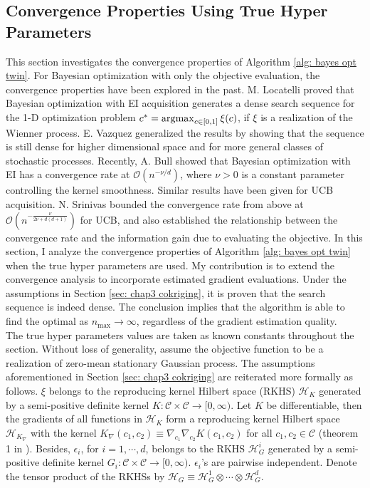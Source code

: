 \subsection{Convergence Properties Using True Hyper Parameters}
\label{sec: chap3 convergence}
This section investigates the convergence properties 
of Algorithm \ref{alg: bayes opt twin}.
For Bayesian optimization with only the 
objective evaluation, the convergence properties have been explored in the past.
M. Locatelli \cite{Locatelli} proved that Bayesian optimization with EI acquisition
generates a dense search sequence 
for the 1-D optimization problem 
$c^*=\operatorname*{\arg\!\max}_{c\in[0,1]} \xi(c)$, if $\xi$ is a realization of the Wienner process.
E. Vazquez \cite{convergen EI} generalized the results by showing that the sequence is still dense
for higher dimensional space and for more general classes of stochastic processes.
Recently, A. Bull \cite{converge Bull} showed that Bayesian optimization with EI
has a convergence rate at
$\mathcal{O}(n^{-\nu/d})$,
where $\nu>0$ is a constant parameter controlling the kernel smoothness. 
Similar results have been given for UCB acquisition. 
N. Srinivas \cite{GP bandit} bounded the convergence rate
from above at $\mathcal{O}(n^{- \frac{\nu}{2\nu+d(d+1)}})$ for UCB, and also established the 
relationship between the convergence rate and the information gain due to evaluating the objective.
In this section, I analyze the convergence properties of Algorithm \ref{alg: bayes opt twin} when 
the true hyper parameters are used. My contribution is to
extend the convergence analysis to incorporate estimated gradient evaluations.
Under the assumptions in Section \ref{sec: chap3 cokriging}, it is proven that
the search sequence is indeed dense.
The conclusion implies that the algorithm is able to find the optimal 
as $n_{\max}\rightarrow \infty$, regardless
of the gradient estimation quality.\\

The true hyper parameters values are taken as known constants throughout the section.
Without loss of generality, assume the objective function to be a realization of 
zero-mean stationary Gaussian process.
The assumptions aforementioned
in Section \ref{sec: chap3 cokriging} are reiterated more formally as follows.
$\xi$ 
belongs to the reproducing kernel Hilbert space (RKHS) $\mathcal{H}_K$ generated by a
semi-positive definite
kernel $K: \mathcal{C}\times \mathcal{C} \rightarrow [0,\infty)$.
Let $K$ be differentiable, then the gradients of all functions in $\mathcal{H}_K$
form a reproducing kernel Hilbert space $\mathcal{H}_{K_\nabla}$ with
the kernel $K_\nabla(c_1,c_2) \equiv \nabla_{c_1}\nabla_{c_2}K(c_1, c_2)$ 
for all $c_1,c_2\in \mathcal{C}$ (theorem 1 in \cite{derivative RKHS}).
Besides, $\epsilon_i$, for $i=1,\cdots, d$, belongs to the RKHS
$\mathcal{H}_{G}^i$ generated by a semi-positive definite
kernel $G_i: \mathcal{C}\times \mathcal{C} \rightarrow [0, \infty)$. $\epsilon_i$'s are pairwise
independent. 
Denote the tensor product of the RKHSs
by $\mathcal{H}_G \equiv \mathcal{H}_{G}^1 \otimes \cdots \otimes \mathcal{H}_G^d$.\\

